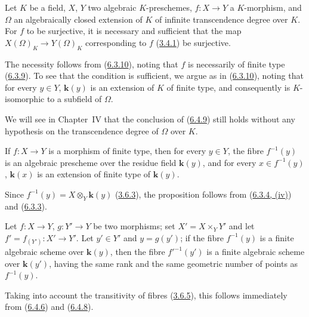 \begin{proposition}[6.4.9]
\label{I.6.4.9}
Let $K$ be a field, $X$, $Y$ two algebraic $K$-preschemes, $f:X\to Y$ a
$K$-morphism, and $\Omega$ an algebraically closed extension of $K$ of
infinite transcendence degree over $K$. For $f$ to be surjective, it is
necessary and sufficient that the map $X(\Omega)_K\to Y(\Omega)_K$
corresponding to $f$ \textup{(\hyperref[I.3.4.1]{3.4.1})} be surjective.
\end{proposition}

The necessity follows from (\hyperref[I.6.3.10]{6.3.10}), noting that
$f$ is necessarily of finite type (\hyperref[I.6.3.9]{6.3.9}). To see
that the condition is sufficient, we argue as in
(\hyperref[I.6.3.10]{6.3.10}), noting that for every $y\in Y$,
$\boldsymbol{k}(y)$ is an extension of $K$ of finite type, and consequently is
$K$-isomorphic to a subfield of $\Omega$.

\begin{remark}[6.4.10]
\label{I.6.4.10}
We will see in Chapter~IV that the conclusion of
(\hyperref[I.6.4.9]{6.4.9}) still holds without any hypothesis on the
transcendence degree of $\Omega$ over $K$.
\end{remark}

\begin{proposition}[6.4.11]
\label{I.6.4.11}
If $f:X\to Y$ is a morphism of finite type, then for every $y\in Y$, the fibre
$f^{-1}(y)$ is an algebraic prescheme over the residue field $\boldsymbol{k}(y)$, and for
every $x\in f^{-1}(y)$, $\boldsymbol{k}(x)$ is an extension of finite type of $\boldsymbol{k}(y)$.
\end{proposition}

Since $f^{-1}(y)=X\otimes_Y \boldsymbol{k}(y)$
(\hyperref[I.3.6.3]{3.6.3}), the proposition follows from
(\hyperref[I.6.3.4]{6.3.4, (iv)}) and
(\hyperref[I.6.3.3]{6.3.3}).

\begin{proposition}[6.4.12]
\label{I.6.4.12}
Let $f:X\to Y$, $g:Y'\to Y$ be two morphisms; set
$X'=X\times_Y Y'$ and let $f'=f_{(Y')}:X'\to Y'$. Let $y'\in Y'$ and
$y=g(y')$; if the fibre $f^{-1}(y)$ is a finite algebraic scheme over $\boldsymbol{k}(y)$,
then the fibre $f'^{-1}(y')$ is a finite algebraic scheme over $\boldsymbol{k}(y')$, having
the same rank and the same geometric number of points as $f^{-1}(y)$.
\end{proposition}

Taking into account the transitivity of fibres
(\hyperref[I.3.6.5]{3.6.5}), this follows immediately from
(\hyperref[I.6.4.6]{6.4.6}) and
(\hyperref[I.6.4.8]{6.4.8}).

